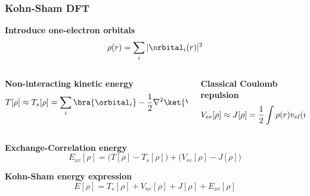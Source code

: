 \begin{frame}
    \frametitle{Kohn-Sham DFT}
    \centering
    \textbf{Introduce one-electron orbitals}
    \begin{equation}
	\nonumber
	\rho(r) = \sum_i |\orbital_i(r)|^2
    \end{equation}

    \vspace{5mm}

    \begin{columns}
    \begin{column}{.50\textwidth}
    \centering
    \textbf{Non-interacting kinetic energy}
    \begin{equation}
	\nonumber
	T[\rho] \approx T_s[\rho] = \sum_i \bra{\orbital_i}-\frac{1}{2}\nabla^2\ket{\orbital_i}
    \end{equation}
    \end{column}
    \begin{column}{.50\textwidth}
    \centering
    \textbf{Classical Coulomb repulsion}
    \begin{equation}
	\nonumber
	V_{ee}[\rho] \approx J[\rho] = \frac{1}{2} \int \rho(r)v_{el}(r)\ud r
    \end{equation}
    \end{column}
    \end{columns}

    \vspace{8mm}

    \textbf{Exchange-Correlation energy}
    \begin{equation}
	\nonumber
	E_{xc}[\rho] = \Big(T[\rho] - T_s[\rho]\Big) + \Big(V_{ee}[\rho] - J[\rho]\Big)
    \end{equation}

    \vspace{5mm}

    \textbf{Kohn-Sham energy expression}
    \begin{equation}
	\nonumber
	E[\rho] = T_s[\rho] + V_{ne}[\rho] + J[\rho] + E_{xc}[\rho]
    \end{equation}
\end{frame}

